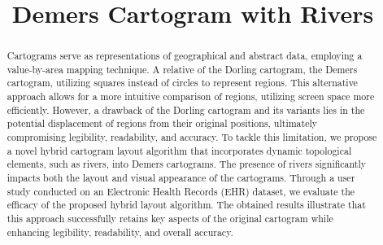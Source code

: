 \documentclass[Afour,sagev,times]{sagej}
\begin{document}
\title{Demers Cartogram with Rivers}



\begin{abstract}
    Cartograms serve as representations of geographical and abstract data, employing a value-by-area mapping technique. A relative of the Dorling cartogram, the Demers cartogram, utilizing squares instead of circles to represent regions. This alternative approach allows for a more intuitive comparison of regions, utilizing screen space more efficiently. However, a drawback of the Dorling cartogram and its variants lies in the potential displacement of regions from their original positions, ultimately compromising legibility, readability, and accuracy. To tackle this limitation, we propose a novel hybrid cartogram layout algorithm that incorporates dynamic topological elements, such as rivers, into Demers cartograms. The presence of rivers significantly impacts both the layout and visual appearance of the cartograms. Through a user study conducted on an Electronic Health Records (EHR) dataset, we evaluate the efficacy of the proposed hybrid layout algorithm. The obtained results illustrate that this approach successfully retains key aspects of the original cartogram while enhancing legibility, readability, and overall accuracy.
\end{abstract}


\maketitle

















% 




\cleardoublepage


\end{document}

